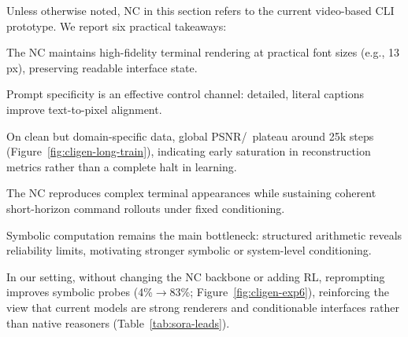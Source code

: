 Unless otherwise noted, NC in this section refers to the current video-based CLI prototype. We report six practical takeaways:
\begin{tcolorbox}[
  colback=apricotglaze!40!white,
  colframe=metablue!40,
  interior style={shade,shading angle=315,left color=white,right color=apricotglaze!55!white},
  boxrule=0pt,
  borderline west={1pt}{0pt}{gray!60},
  left=6pt,right=4pt,top=3pt,bottom=3pt]
\small
\begin{badgeitems}
  \item The NC maintains high-fidelity terminal rendering at practical font sizes (e.g., 13\,px), preserving readable interface state.
  \item Prompt specificity is an effective control channel: detailed, literal captions improve text-to-pixel alignment.
  \item On clean but domain-specific data, global PSNR/\SSIM~plateau around 25k steps (Figure~\ref{fig:cligen-long-train}), indicating early saturation in reconstruction metrics rather than a complete halt in learning.
  \item The NC reproduces complex terminal appearances while sustaining coherent short-horizon command rollouts under fixed conditioning.
  \item Symbolic computation remains the main bottleneck: structured arithmetic reveals reliability limits, motivating stronger symbolic or system-level conditioning.
  \item In our setting, without changing the NC backbone or adding RL, reprompting improves symbolic probes (4\%$\rightarrow$83\%; Figure~\ref{fig:cligen-exp6}), reinforcing the view that current models are strong renderers and conditionable interfaces rather than native reasoners (Table~\ref{tab:sora-leads}).
\end{badgeitems}
\end{tcolorbox}


